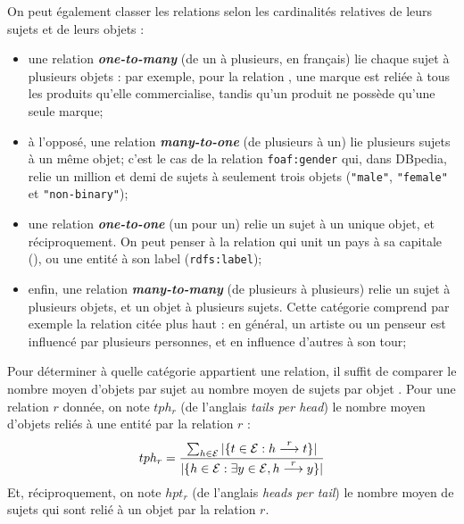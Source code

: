 
On peut également classer les relations selon les cardinalités relatives de leurs sujets et de leurs objets :
\begin{itemize}
    \item une relation \textbf{\textit{one-to-many}} (de un à plusieurs, en français) lie chaque sujet à plusieurs objets : par exemple, pour la relation , 
    une marque est reliée à tous les produits qu'elle commercialise, tandis qu'un produit ne possède qu'une seule marque;
    \item à l'opposé, une relation \textbf{\textit{many-to-one}} (de plusieurs à un) lie plusieurs sujets à un même objet; c'est le cas de la relation \texttt{foaf:gender} qui, dans DBpedia, relie un million et demi de sujets à seulement trois objets (\texttt{"male"}, \texttt{"female"} et \texttt{"non-binary"});
    \item une relation \textbf{\textit{one-to-one}} (un pour un) relie un sujet à un unique objet, et réciproquement. On peut penser à la relation qui unit un pays à sa capitale (), ou une entité à son label (\texttt{rdfs:label});
    \item enfin, une relation \textbf{\textit{many-to-many}} (de plusieurs à plusieurs) relie un sujet à plusieurs objets, et un objet à plusieurs sujets. Cette catégorie comprend par exemple la relation  citée plus haut : en général, un artiste ou un penseur est influencé par plusieurs personnes, et en influence d'autres à son tour;
\end{itemize}

Pour déterminer à quelle catégorie appartient une relation, il suffit de comparer le nombre moyen d'objets par sujet au nombre moyen de sujets par objet \cite{transh}. Pour une relation $r$ donnée, on note $tph_r$ (de l'anglais \textit{tails per head}) le nombre moyen d'objets reliés à une entité par la relation $r$ :
\begin{equation}
    tph_r = \frac{\sum_{h \in \mathcal{E}} |\{ t \in \mathcal{E} : h \overset{r}{\longrightarrow} t \}|}{|\{ h \in \mathcal{E} : \exists y \in \mathcal{E}, h \overset{r}{\longrightarrow} y \}| }
\end{equation}
Et, réciproquement, on note $hpt_r$ (de l'anglais \textit{heads per tail}) le nombre moyen de sujets qui sont relié à un objet par la relation $r$. 

